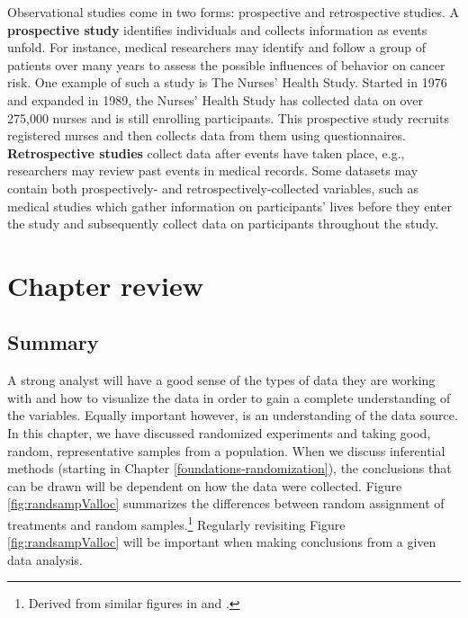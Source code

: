 \documentclass[
  10pt,
  openany]{book}
\begin{document}
Observational studies come in two forms: prospective and retrospective studies.
A \textbf{prospective study} identifies individuals and collects information as events unfold.
For instance, medical researchers may identify and follow a group of patients over many years to assess the possible influences of behavior on cancer risk.
One example of such a study is The Nurses' Health Study.
Started in 1976 and expanded in 1989, the Nurses' Health Study has collected data on over 275,000 nurses and is still enrolling participants.
This prospective study recruits registered nurses and then collects data from them using questionnaires.
\textbf{Retrospective studies} collect data after events have taken place, e.g., researchers may review past events in medical records.
Some datasets may contain both prospectively- and retrospectively-collected variables, such as medical studies which gather information on participants' lives before they enter the study and subsequently collect data on participants throughout the study.

\clearpage

\hypertarget{chp2-review}{%
\section{Chapter review}\label{chp2-review}}

\hypertarget{summary-1}{%
\subsection{Summary}\label{summary-1}}

A strong analyst will have a good sense of the types of data they are working with and how to visualize the data in order to gain a complete understanding of the variables.
Equally important however, is an understanding of the data source.
In this chapter, we have discussed randomized experiments and taking good, random, representative samples from a population.
When we discuss inferential methods (starting in Chapter \ref{foundations-randomization}), the conclusions that can be drawn will be dependent on how the data were collected.
Figure \ref{fig:randsampValloc} summarizes the differences between random assignment of treatments and random samples.\footnote{Derived from similar figures in \citet{ISCAM} and \citet{sleuth}.}
Regularly revisiting Figure \ref{fig:randsampValloc} will be important when making conclusions from a given data analysis.
\end{document}
